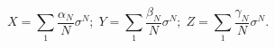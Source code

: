 \begin{equation}
\label{taylor}
X=\sum_1\frac{\alpha_N}{N}\sigma^N;\;Y=\sum_1\frac{\beta_N}{N}\sigma^N;\;Z=\sum_1\frac{\gamma_N}{N}\sigma^N.
\end{equation} 
